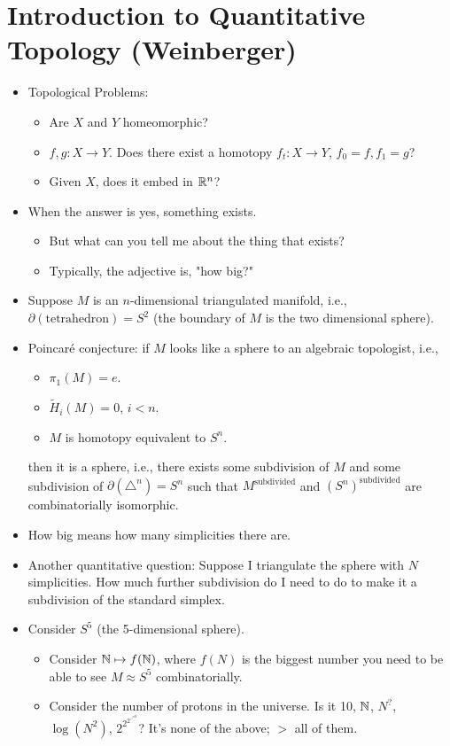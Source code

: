 \documentclass[../main.tex]{subfiles}
\begin{document}
\section{Introduction to Quantitative Topology (Weinberger)}
\begin{itemize}
    \item {}Topological Problems:
    \begin{itemize}
        \item Are $X$ and $Y$ homeomorphic?
        \item $f,g:X\to Y$. Does there exist a homotopy $f_t:X\to Y$, $f_0=f,f_1=g$?
        \item Given $X$, does it embed in $\mathbb{R}^n$?
    \end{itemize}
    \item When the answer is yes, something exists.
    \begin{itemize}
        \item But what can you tell me about the thing that exists?
        \item Typically, the adjective is, "how big?"
    \end{itemize}
    \item Suppose $M$ is an $n$-dimensional triangulated manifold, i.e., $\partial(\text{tetrahedron})=S^2$ (the boundary of $M$ is the two dimensional sphere).
    \item Poincar\'{e} conjecture: if $M$ looks like a sphere to an algebraic topologist, i.e.,
    \begin{itemize}
        \item $\pi_1(M)=e$.
        \item $\tilde{H}_i(M)=0$, $i<n$.
        \item $M$ is homotopy equivalent to $S^n$.
    \end{itemize}
    then it is a sphere, i.e., there exists some subdivision of $M$ and some subdivision of $\partial(\triangle^n)=S^n$ such that $M^\text{subdivided}$ and $(S^n)^\text{subdivided}$ are combinatorially isomorphic.
    \item How big means how many simplicities there are.
    \item Another quantitative question: Suppose I triangulate the sphere with $N$ simplicities. How much further subdivision do I need to do to make it a subdivision of the standard simplex.
    \item Consider $S^5$ (the 5-dimensional sphere).
    \begin{itemize}
        \item Consider $\mathbb{N}\mapsto f(\mathbb{N})$, where $f(N)$ is the biggest number you need to be able to see $M\approx S^5$ combinatorially.
        \item Consider the number of protons in the universe. Is it 10, $\mathbb{N}$, $N^?$, $\log(N^2)$, $2^{2^{2^{\nearrow^N}}}$? It's none of the above; $>$ all of them.
    \end{itemize}
\end{itemize}
\end{document}
